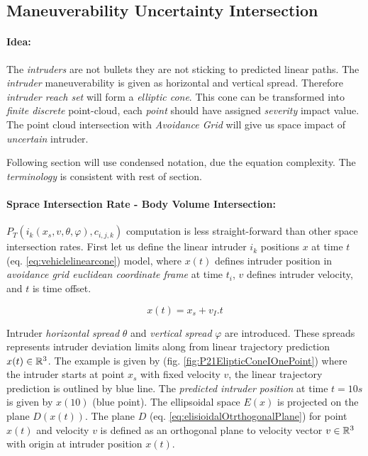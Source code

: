 \subsection{Maneuverability Uncertainty Intersection}\label{s:uncertaintyIntersection}
\paragraph{Idea:} The \emph{intruders} are not bullets they are not sticking to predicted linear paths. The \emph{intruder} maneuverability is given as horizontal and vertical spread. Therefore \emph{intruder reach set} will form a \emph{elliptic cone}. This cone can be transformed into \emph{finite discrete } point-cloud, each \emph{point} should have assigned \emph{severity} impact value.  The point cloud intersection with  \emph{Avoidance Grid} will give us space impact of \emph{uncertain} intruder.


\begin{note}
    Following section will use condensed notation, due the equation complexity. The \emph{terminology} is consistent with rest of section. 
\end{note}

\paragraph{Sprace Intersection Rate - Body Volume Intersection:} $P_T(i_k({x}_s,{v},\theta,\varphi),c_{i,j,k})$
computation is less straight-forward than other space intersection rates. First let us define the linear intruder $i_k$ positions ${x}$ at time $t$ (eq. \ref{eq:vehiclelinearcone}) model, where ${x}(t)$ defines intruder position in \emph{avoidance grid euclidean coordinate frame} at time $t_i$, ${v}$ defines intruder velocity, and $t$ is time offset.

\begin{equation}\label{eq:vehiclelinearcone}
    x(t)=x_s + v_I.t
\end{equation}

\noindent Intruder \emph{horizontal spread} $\theta$ and \emph{vertical spread} $\varphi$ are introduced. These spreads represents intruder deviation limits along from linear trajectory prediction ${x}(t)\in\mathbb{R}^3$. The example is given by (fig. \ref{fig:P21ElipticConeIOnePoint}) where the intruder starts at point ${x}_s$ with fixed velocity $v$, the linear trajectory prediction is outlined by blue line. The \emph{predicted intruder position} at time $t=10s$ is given by ${x}(10)$ (blue point). The ellipsoidal space $E({x})$ is projected on the plane $D({x}(t))$. The plane $D$ (eq. \ref{eq:elisioidalOtrthogonalPlane}) for point ${x}(t)$ and velocity ${v}$ is defined as an orthogonal plane to velocity vector ${v}\in\mathbb{R}^3$ with origin at intruder position ${x}(t)$. 

